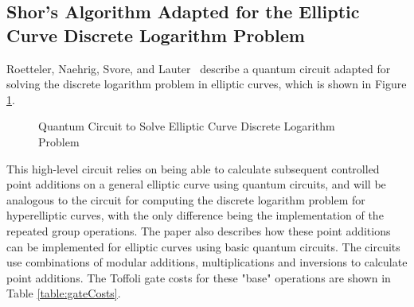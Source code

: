 \subsection{Shor's Algorithm Adapted for the Elliptic Curve Discrete
 Logarithm Problem}
Roetteler, Naehrig, Svore, and Lauter~\cite{roetteler2017quantum} describe a quantum circuit adapted for solving the discrete logarithm problem in elliptic curves, which is shown in Figure \ref{fig:ECDLPcircuit}.
\begin{figure}[!htb]
\centering
\resizebox{\linewidth}{!}{}
\caption{Quantum Circuit to Solve Elliptic Curve Discrete Logarithm Problem~\cite{roetteler2017quantum}}
\label{fig:ECDLPcircuit}
\end{figure} 
This high-level circuit relies on being able to calculate subsequent controlled point additions on a general elliptic curve using quantum circuits, and will be analogous to the circuit for computing the discrete logarithm problem for hyperelliptic curves, with the only difference being the implementation of the repeated group operations. The paper also describes how these point additions can be implemented for elliptic curves using basic quantum circuits. The circuits use combinations of modular additions, multiplications and inversions to calculate point additions. The Toffoli gate costs for these "base" operations are shown in Table \ref{table:gateCosts}. 
\begin{table}[!htb]
\caption{Costs for modular arithmetic in quantum circuits in terms of $n$, the bit-size of the prime which the group is defined over~\cite{roetteler2017quantum}}
\label{table:gateCosts}
\end{table}
